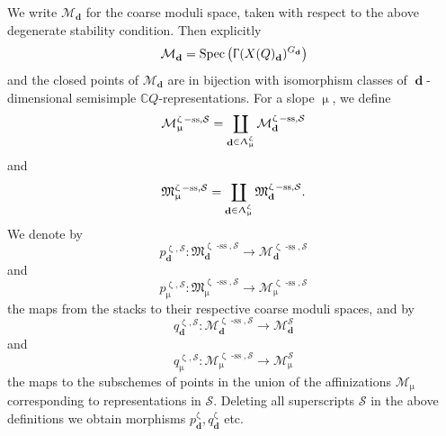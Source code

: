 \documentclass[a4paper,10pt]{amsart}
\renewcommand{\zeta}{\upzeta}
\renewcommand{\Lambda}{\Uplambda}
\renewcommand{\Gamma}{\Upgamma}
\renewcommand{\mu}{\upmu}
\newcommand{\SP}{\mathcal{S}}
\newcommand{\Mst}{\mathfrak{M}}
\newcommand{\Msp}{\mathcal{M}}
\DeclareMathOperator{\sst}{-ss}
\DeclareMathOperator{\dd}{\mathbf{d}}
\DeclareMathOperator{\Spec}{Spec}
\begin{document}
We write $\Msp_{\dd}$ for the coarse moduli space, taken with respect to the above degenerate stability condition.  Then explicitly
\[
\Msp_{\dd}=\Spec\left(\Gamma(X(Q)_{\dd})^{G_{\dd}}\right)
\]
and the closed points of $\Msp_{\dd}$ are in bijection with isomorphism classes of $\dd$-dimensional semisimple $\mathbb{C}Q$-representations.
\smallbreak
For a slope $\mu$, we define 
\begin{equation}
\Msp_{\mu}^{\zeta\sst,\SP}=\coprod_{\dd\in\Lambda_{\mu}^{\zeta}}\Msp_{\dd}^{\zeta\sst,\SP}
\end{equation}
and
\begin{equation}
\Mst_{\mu}^{\zeta\sst,\SP}=\coprod_{\dd\in \Lambda_{\mu}^{\zeta}}\Mst_{\dd}^{\zeta\sst,\SP}.
\end{equation}
We denote by 
\begin{equation}
\label{pdef}
p_{\dd}^{\zeta,\SP}\colon \Mst^{\zeta\sst,\SP}_{\dd}\rightarrow \Msp^{\zeta\sst,\SP}_{\dd}
\end{equation}
and
\begin{equation}
p_{\mu}^{\zeta,\SP}\colon \Mst^{\zeta\sst,\SP}_{\mu}\rightarrow \Msp^{\zeta\sst,\SP}_{\mu}
\end{equation}
the maps from the stacks to their respective coarse moduli spaces, and by
\begin{equation}
\label{qdef}
q_{\dd}^{\zeta,\SP}\colon \Msp^{\zeta\sst,\SP}_{\dd}\rightarrow \Msp_{\dd}^{\SP}
\end{equation}
and
\begin{equation}
\label{qmudef}
q_{\mu}^{\zeta,\SP}\colon \Msp^{\zeta\sst,\SP}_{\mu}\rightarrow \Msp_{\mu}^{\SP}
\end{equation}
the maps to the subschemes of points in the union of the affinizations $\Msp_{\mu}$ corresponding to representations in $\mathcal{S}$.  Deleting all superscripts $\SP$ in the above definitions we obtain morphisms $p^{\zeta}_{\dd},q^{\zeta}_{\dd}$ etc.
\end{document}

